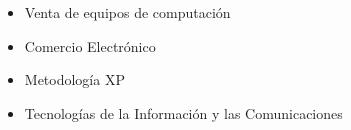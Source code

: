 \documentclass[12pt,a4paper]{article}
\begin{document}
\begin{itemize}
    \item Venta de equipos de computación
    \item Comercio Electrónico
    \item Metodología XP
    \item Tecnologías de la Información y las Comunicaciones
\end{itemize}
\end{document}
